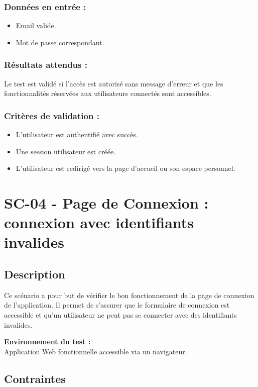 \documentclass[a4paper,12pt]{report}
\begin{document}
\subsubsection{Données en entrée :}

\begin{itemize}
    \item Email valide.
    \item Mot de passe correspondant.
\end{itemize}

\subsubsection{Résultats attendus :}
Le test est validé si l’accès est autorisé sans message d’erreur et que les fonctionnalités réservées aux utilisateurs connectés sont accessibles.


\subsubsection{Critères de validation :}
\begin{itemize}
    \item L’utilisateur est authentifié avec succès.
    \item Une session utilisateur est créée.
    \item L’utilisateur est redirigé vers la page d’accueil ou son espace personnel.
\end{itemize}
\newpage

\section{SC-04 - Page de Connexion : connexion avec identifiants invalides}
\label{Co3}
\subsection*{Description}
Ce scénario a pour  but de vérifier le bon fonctionnement de la page de connexion de l’application.
Il permet de s’assurer que le formulaire de connexion est accessible et qu'un utilisateur ne peut pas se connecter avec des identifiants invalides.

\textbf{Environnement du test :}\\
Application Web fonctionnelle accessible via un navigateur.
\subsection*{Contraintes}
\end{document}
